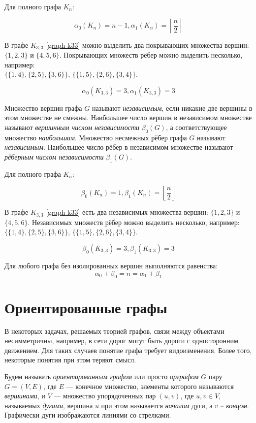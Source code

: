 Для полного графа $K_n$:

\[\alpha_0(K_n)=n-1, \alpha_1(K_n)=\left\lceil \frac{n}{2} \right\rceil \]

В графе $K_{3,3}$ \ref{graph k33} можно выделить два покрывающих множества 
вершин: $\{1,2,3\}$ и $\{4,5,6\}$. Покрывающих множеств рёбер можно выделить 
несколько, например:\\ $\{\{1,4\}, \{2,5\}, \{3,6\} \}$, $\{ \{1,5\}, \{2,6\}, 
\{3,4\} \}$.

\[\alpha_0(K_{3,3})=3, \alpha_1(K_{3,3})=3\]

Множество вершин графа $G$ называют \emph{независимым}, если никакие две 
вершины в этом множестве не смежны. Наибольшее число вершин в независимом 
множестве называют \emph{вершинным числом независимости} $\beta_0(G)$, а 
соответствующее множество \emph{наибольшим}. Множество несмежных рёбер графа 
$G$ называют \emph{независимым}. Наибольшее число рёбер в независимом множестве 
называют \emph{рёберным числом независимости} $\beta_1(G)$.

Для полного графа $K_n$:

\[\beta_0(K_n)=1, \beta_1(K_n)=\left\lfloor \frac{n}{2} \right\rfloor \]

В графе $K_{3,3}$ \ref{graph k33} есть два независимых множества вершин: 
$\{1,2,3\}$ и $\{4,5,6\}$. Независимых множеств рёбер можно выделить 
несколько, например:\\ $\{\{1,4\}, \{2,5\}, \{3,6\} \}$, $\{ \{1,5\}, \{2,6\}, 
\{3,4\} \}$.

\[\beta_0(K_{3,3})=3, \beta_1(K_{3,3})=3\]

\begin{theorem}
Для любого графа без изолированных вершин выполняются равенства: \[\alpha_0 + 
\beta_0 = n = \alpha_1 + \beta_1\]
\end{theorem}

\section{Ориентированные графы}

В некоторых задачах, решаемых теорией графов, связи между объектами 
несимметричны, например, в сети дорог могут быть дороги с односторонним 
движением. Для таких случаев понятие графа требует видоизменения. Более того, 
некоторые понятия при этом теряют смысл.

Будем называть \emph{ориентированным графом} или просто \emph{орграфом} $G$ 
пару $G = (V, E)$, где $E$ --- конечное множество, элементы которого называются 
\emph{вершинами}, и $V$ --- множество упорядоченных пар $(u, v)$, где
$u,v \in V$, называемых \emph{дугами}, вершина $u$ при этом называется 
\emph{началом} дуги, а $v$ – \emph{концом}. Графически дуги изображаются 
линиями со стрелками.

